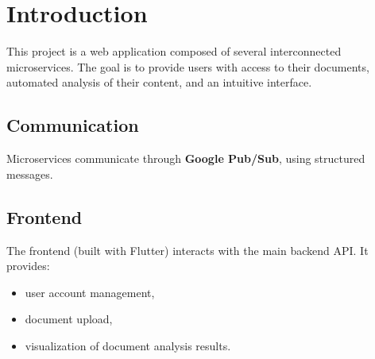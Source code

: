 \chapter{Introduction}

This project is a web application composed of several interconnected microservices. The goal is to provide users with access to their documents, automated analysis of their content, and an intuitive interface.

\section{Communication}
Microservices communicate through \textbf{Google Pub/Sub}, using structured messages.

\section{Frontend}
The frontend (built with Flutter) interacts with the main backend API. It provides:
\begin{itemize}
    \item user account management,
    \item document upload,
    \item visualization of document analysis results.
\end{itemize}